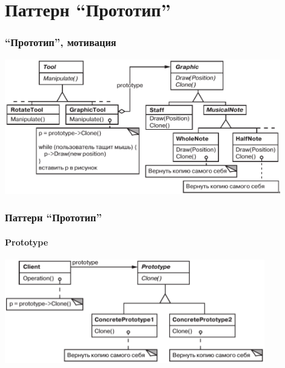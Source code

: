\documentclass{../../slides-style}
\begin{document}
    \section{Паттерн ``Прототип''}

    \begin{frame}
        \frametitle{``Прототип'', мотивация}
        \begin{center}
            \includegraphics[width=0.9\textwidth]{musicalEditor.png}
        \end{center}
    \end{frame}

    \begin{frame}
        \frametitle{Паттерн ``Прототип''}
        \framesubtitle{Prototype}
        \begin{center}
            \includegraphics[width=0.85\textwidth]{prototype.png}
        \end{center}
    \end{frame}
    
\end{document}
